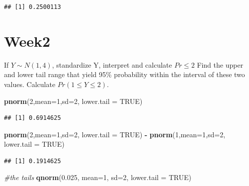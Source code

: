 \documentclass[
]{book}
\newenvironment{Shaded}{\begin{snugshade}}{\end{snugshade}}
\newcommand{\CommentTok}[1]{\textcolor[rgb]{0.56,0.35,0.01}{\textit{#1}}}
\newcommand{\DataTypeTok}[1]{\textcolor[rgb]{0.13,0.29,0.53}{#1}}
\newcommand{\DecValTok}[1]{\textcolor[rgb]{0.00,0.00,0.81}{#1}}
\newcommand{\FloatTok}[1]{\textcolor[rgb]{0.00,0.00,0.81}{#1}}
\newcommand{\KeywordTok}[1]{\textcolor[rgb]{0.13,0.29,0.53}{\textbf{#1}}}
\newcommand{\NormalTok}[1]{#1}
\newcommand{\OperatorTok}[1]{\textcolor[rgb]{0.81,0.36,0.00}{\textbf{#1}}}
\newcommand{\OtherTok}[1]{\textcolor[rgb]{0.56,0.35,0.01}{#1}}
\newcommand{\StringTok}[1]{\textcolor[rgb]{0.31,0.60,0.02}{#1}}
\begin{document}
\begin{verbatim}
## [1] 0.2500113
\end{verbatim}

\hypertarget{week2}{%
\section{Week2}\label{week2}}

If \(Y \sim N(1,4)\), standardize Y, interpret and calculate \(Pr \leq 2\) Find the upper and lower tail range that yield 95\% probability within the interval of these two values. Calculate \(Pr(1\leq Y \leq 2)\).

\begin{Shaded}
\begin{Highlighting}[]
\KeywordTok{pnorm}\NormalTok{(}\DecValTok{2}\NormalTok{,}\DataTypeTok{mean=}\DecValTok{1}\NormalTok{,}\DataTypeTok{sd=}\DecValTok{2}\NormalTok{, }\DataTypeTok{lower.tail =} \OtherTok{TRUE}\NormalTok{)}
\end{Highlighting}
\end{Shaded}

\begin{verbatim}
## [1] 0.6914625
\end{verbatim}

\begin{Shaded}
\begin{Highlighting}[]
\KeywordTok{pnorm}\NormalTok{(}\DecValTok{2}\NormalTok{,}\DataTypeTok{mean=}\DecValTok{1}\NormalTok{,}\DataTypeTok{sd=}\DecValTok{2}\NormalTok{, }\DataTypeTok{lower.tail =} \OtherTok{TRUE}\NormalTok{) }\OperatorTok{-}\StringTok{ }\KeywordTok{pnorm}\NormalTok{(}\DecValTok{1}\NormalTok{,}\DataTypeTok{mean=}\DecValTok{1}\NormalTok{,}\DataTypeTok{sd=}\DecValTok{2}\NormalTok{, }\DataTypeTok{lower.tail =} \OtherTok{TRUE}\NormalTok{)}
\end{Highlighting}
\end{Shaded}

\begin{verbatim}
## [1] 0.1914625
\end{verbatim}

\begin{Shaded}
\begin{Highlighting}[]
\CommentTok{#the tails }
\KeywordTok{qnorm}\NormalTok{(}\FloatTok{0.025}\NormalTok{, }\DataTypeTok{mean=}\DecValTok{1}\NormalTok{, }\DataTypeTok{sd=}\DecValTok{2}\NormalTok{, }\DataTypeTok{lower.tail =} \OtherTok{TRUE}\NormalTok{)}
\end{Highlighting}
\end{Shaded}
\end{document}
